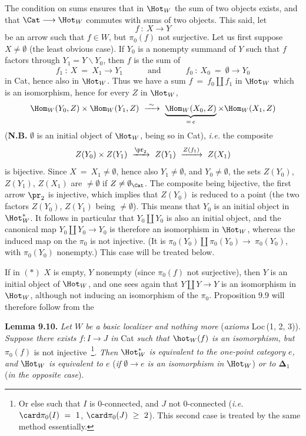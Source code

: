 The condition on sums ensures that in $\Hot_W$ the sum of two objects exists, and that $\Cat\longrightarrow\Hot_W$ commutes with sums of two objects. This said, let
\[
f\ :\ X\longrightarrow Y \tag*{$(*)$} %
\]
be an arrow such that $f\in W$, but $\pi_0(f)$ not surjective. Let us first suppose $X\neq\emptyset$ (the least obvious case). If $Y_0$ is a nonempty summand of $Y$ such that $f$ factors through $Y_1=Y\backslash Y_0$, then $f$ is the sum of
\[
f_1\ :\ X\ =\ X_1\longrightarrow Y_1\qquad\quad\text{and}\qquad\quad f_0\ :\ X_0\ =\ \emptyset\longrightarrow Y_0
\]
in Cat, hence also in $\Hot_W$. Thus we have a sum $f\ =\ f_0\amalg f_1$ in $\Hot_W$ which is an isomorphism, hence for every $Z$ in $\Hot_W$,
\[
\Hom_W(Y_0,Z)\times\Hom_W(Y_1,Z)\ \xrightarrow{\ \sim\ }\ \underbrace{\Hom_W(X_0,Z)}_{=\,e}\times\Hom_W(X_1,Z)
\]
(\textbf{N.B.} $\emptyset$ is an initial object of $\Hot_W$, being so in Cat), \textit{i.e.} the composite
\[
Z(Y_0)\times Z(Y_1)\ \xrightarrow{\pr_2}\ Z(Y_1)\ \xrightarrow{Z(f_1)}\ Z(X_1)
\]
is bijective. Since $X\ =\ X_1\neq\emptyset$, hence also $Y_1\neq\emptyset$, and $Y_0\neq\emptyset$, the sets $Z(Y_0)$, $Z(Y_1)$, $Z(X_1)$ are $\neq\emptyset$ if $Z\neq\emptyset_{\Cat}$. The composite being bijective, the first arrow $\pr_2$ is injective, which implies
that $Z(Y_0)$ is reduced to a point (the two factors $Z(Y_0)$, $Z(Y_1)$ being $\neq\emptyset$). This means that $Y_0$ is an initial object in $\Hot_W^*$. It follows in particular that $Y_0\amalg Y_0$ is also an initial object, and the canonical map $Y_0\amalg Y_0\longrightarrow Y_0$ is therefore an isomorphism in $\Hot_W$, whereas the induced map on the $\pi_0$ is not injective. (It is $\pi_0(Y_0)\amalg\pi_0(Y_0)\longrightarrow\ \pi_0(Y_0)$, with $\pi_0(Y_0)$ nonempty.) This case will be treated below.

If in $(*)$ $X$ is empty, $Y$ nonempty (since $\pi_0(f)$ not surjective), then $Y$ is an initial object of $\Hot_W$, and one sees again that $Y\amalg Y\longrightarrow Y$ is an isomorphism in $\Hot_W$, although not inducing an isomorphism of the $\pi_0$. Proposition 9.9 will therefore follow from the

\textbf{Lemma 9.10.} \textit{Let $W$ be a basic localizer and nothing more} (\textit{axioms} Loc\,(1, 2, 3)). \textit{Suppose there exists $f:I\longrightarrow J$ in} Cat \textit{such that} $\hot_W(f)$ \textit{is an isomorphism, but $\pi_0(f)$} is not injective~\footnote[56]{Or else such that $I$ is 0-connected, and $J$ not 0-connected (\textit{i.e.} $\card\pi_0(I)\ =\ 1$, $\card\pi_0(J)\ \geq\ 2$). This second case is treated by the same method essentially.}. \textit{Then} $\Hot_W^*$ \textit{is equivalent to the one-point category $e$, and} $\Hot_W$ \textit{is equivalent to $e$} (\textit{if $\emptyset\longrightarrow e$ is an isomorphism in} $\Hot_W$) \textit{or to $\boldsymbol{\Delta}_1$} (\textit{in the opposite case}).


